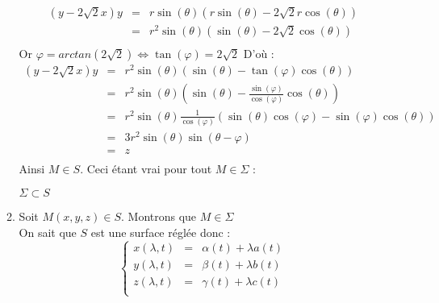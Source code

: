 \begin{enumerate}
\begin{enumerate}
\[\begin{array}{rcl}
                    (y-2\sqrt{2}x)y & = & r\sin{(\theta)}(r\sin{(\theta)}-2\sqrt{2}r\cos{(\theta)})   \\
                                    & = & r^{2}\sin{(\theta)}(\sin{(\theta)}-2\sqrt{2}\cos{(\theta)}) \\
                  \end{array}
                \] Or $\varphi = arctan(2\sqrt{2})\iff\tan{(\varphi)}=2\sqrt{2}$ D'où :
                \[
                  \begin{array}{rcl}
                    (y-2\sqrt{2}x)y & = & r^{2}\sin{(\theta)}(\sin{(\theta)}-\tan{(\varphi)}\cos{(\theta)})                                           \\
                                    & = & r^{2}\sin{(\theta)}(\sin{(\theta)}-\frac{\sin{(\varphi)}}{\cos{(\varphi)}}\cos{(\theta)})                   \\
                                    & = & r^{2}\sin{(\theta)}\frac{1}{\cos{(\varphi)}}(\sin{(\theta)}\cos{(\varphi)} - \sin{(\varphi)}\cos{(\theta)}) \\
                                    & = & 3r^{2}\sin{(\theta)}\sin{(\theta - \varphi)}                                                                \\
                                    & = & z                                                                                                           \\
                  \end{array}
                \]Ainsi $M\in S$. Ceci étant vrai pour tout $M\in\Sigma$ :
                \begin{result}
                  $\Sigma \subset S$
                \end{result}
          \item
                Soit $M(x, y, z) \in S$. Montrons que $M\in \Sigma$\\
                On sait que $S$ est une surface réglée donc :
                \[
                  \left\{
                  \begin{array}{rcl}
                    x(\lambda, t) & = & \alpha(t) + \lambda a(t) \\
                    y(\lambda, t) & = & \beta(t) + \lambda b(t)  \\
                    z(\lambda, t) & = & \gamma(t) + \lambda c(t) \\
                  \end{array}
                  \right.
\]
\end{enumerate}
\end{enumerate}

